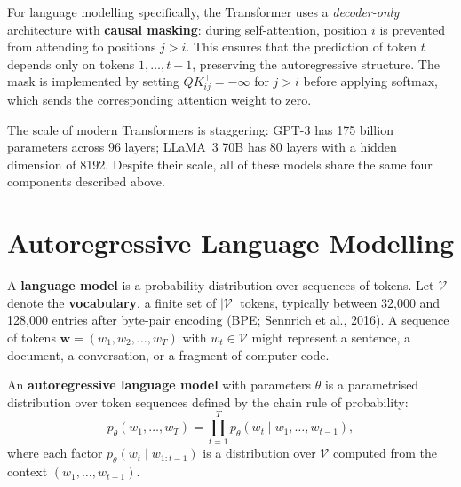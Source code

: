 \begin{remark}
For language modelling specifically, the Transformer uses a \emph{decoder-only} architecture with \textbf{causal masking}: during self-attention, position $i$ is prevented from attending to positions $j > i$. This ensures that the prediction of token $t$ depends only on tokens $1, \ldots, t-1$, preserving the autoregressive structure. The mask is implemented by setting $QK^\top_{ij} = -\infty$ for $j > i$ before applying softmax, which sends the corresponding attention weight to zero.
\end{remark}

The scale of modern Transformers is staggering: GPT-3 has 175 billion parameters across 96 layers; LLaMA~3 70B has 80 layers with a hidden dimension of 8192. Despite their scale, all of these models share the same four components described above.

\section{Autoregressive Language Modelling}
\label{sec:autoregressive-lm}

A \textbf{language model} is a probability distribution over sequences of tokens. Let $\mathcal{V}$ denote the \textbf{vocabulary}, a finite set of $|\mathcal{V}|$ tokens, typically between 32{,}000 and 128{,}000 entries after byte-pair encoding (BPE; Sennrich et al., 2016). A sequence of tokens $\mathbf{w} = (w_1, w_2, \ldots, w_T)$ with $w_t \in \mathcal{V}$ might represent a sentence, a document, a conversation, or a fragment of computer code.

\begin{definition}
\label{def:autoregressive-lm}
An \textbf{autoregressive language model} with parameters $\theta$ is a parametrised distribution over token sequences defined by the chain rule of probability:
\begin{equation}
\label{eq:lm-chain-rule}
p_\theta(w_1, \ldots, w_T) = \prod_{t=1}^{T} p_\theta(w_t \mid w_1, \ldots, w_{t-1}),
\end{equation}
where each factor $p_\theta(w_t \mid w_{1:t-1})$ is a distribution over $\mathcal{V}$ computed from the context $(w_1, \ldots, w_{t-1})$.
\end{definition}

